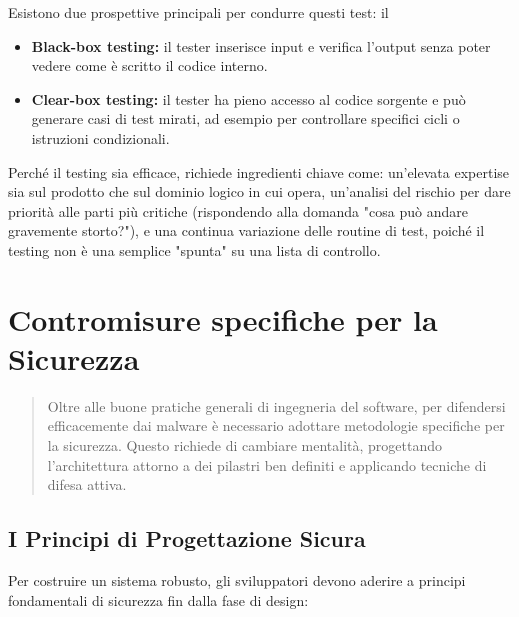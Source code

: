 \documentclass{article}
\begin{document}
Esistono due prospettive principali per condurre questi test: il

\begin{itemize}
    \item \textbf{Black-box testing:} il tester inserisce input e verifica l'output senza poter vedere come è scritto il codice interno.
    \item \textbf{Clear-box testing:} il tester ha pieno accesso al codice sorgente e può generare casi di test mirati, ad esempio per controllare specifici cicli o istruzioni condizionali.
\end{itemize}

Perché il testing sia efficace, richiede ingredienti chiave come: un'elevata expertise sia sul prodotto che sul dominio logico in cui opera, un'analisi del rischio per dare priorità alle parti più critiche (rispondendo alla domanda "cosa può andare gravemente storto?"), e una continua variazione delle routine di test, poiché il testing non è una semplice "spunta" su una lista di controllo.

\vspace{0.8cm}

\section*{Contromisure specifiche per la Sicurezza}

\begin{quote}
    Oltre alle buone pratiche generali di ingegneria del software, per difendersi efficacemente dai malware è necessario adottare metodologie specifiche per la sicurezza. Questo richiede di cambiare mentalità, progettando l'architettura attorno a dei pilastri ben definiti e applicando tecniche di difesa attiva.
\end{quote}

\subsection*{I Principi di Progettazione Sicura}

Per costruire un sistema robusto, gli sviluppatori devono aderire a principi fondamentali di sicurezza fin dalla fase di design:
\end{document}
